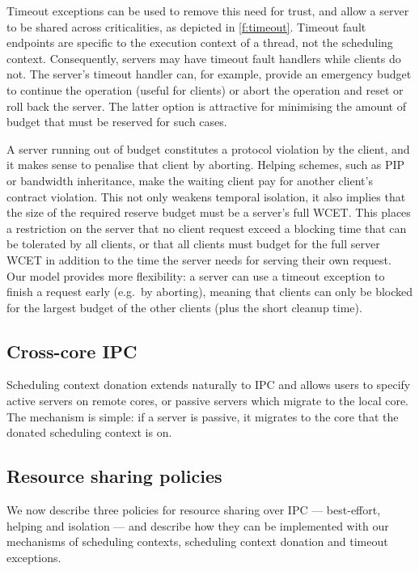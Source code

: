 Timeout exceptions can be used to remove this need for trust, and
allow a server to be shared across criticalities, as depicted in \cref{f:timeout}. Timeout fault endpoints are specific to the
execution context of a thread, not the scheduling context. Consequently, servers may have timeout
fault handlers while clients do not. The 
server's timeout handler can, for example, provide an emergency budget
to continue the operation (useful for  clients) or abort
the operation and reset or roll back the server. The latter option is
attractive for minimising the amount of budget that must be reserved
for such cases.

A server running out of budget constitutes a protocol violation
by the client, and it makes sense to penalise that
client by aborting. Helping schemes, such as PIP or bandwidth
inheritance,
make the waiting client pay for
another client's contract violation. This not only weakens temporal isolation,
it also implies that the size of the required reserve budget
must be a server's full WCET. This places a restriction on the server
that no client request exceed a blocking time that can be tolerated by
all clients, or that all clients must budget for the full server WCET in
addition to the time the server needs for serving their own request.
Our model provides more flexibility: a server can use a timeout
exception to finish a request early (e.g.\ by aborting), meaning that clients can only be
blocked for the largest budget of the other clients (plus the short
cleanup time).

\subsection{Cross-core IPC}


Scheduling context donation extends naturally to IPC and allows users to specify active servers on
remote cores, or passive servers which migrate to the local core. The mechanism is simple: if a
server is passive, it migrates to the core that the donated scheduling context is on. 

\subsection{Resource sharing policies}

We now describe three policies for resource sharing over \gls{IPC} --- best-effort, helping and
isolation --- and describe how they can be implemented 
with our mechanisms of scheduling contexts, scheduling context donation and timeout exceptions.

